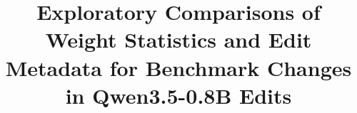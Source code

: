 \documentclass[10pt]{article}
\title{Exploratory Comparisons of Weight Statistics and Edit Metadata for Benchmark Changes in Qwen3.5-0.8B Edits}
\begin{document}
\maketitle
\begin{abstract}\end{abstract}









\appendix

\end{document}
